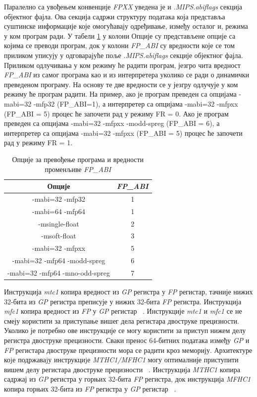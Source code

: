 \documentclass[12pt,oneside]{memoir}
\begin{document}
\indent Паралелно са увођењем конвенције \textit{FPXX} уведена је и  \textit{.MIPS.abiflags} секција објектног фајла. Ова секција садржи структуру података која представља суштинске информације које омогућавају одређивање, између осталог и, режима у ком програм ради. У табели \ref{tbl:fpabi} у колони Опције су представљене опције са којима се преводи програм, док у колони \textit{FP\_ABI} су вредности које се том приликом уписују у одговарајуће поље \textit{.MIPS.abiflags} секције објектног фајла. Приликом одлучивања у ком режиму ће радити програм, језгро чита вредност \textit{FP\_ABI} из самог програма као и из интерпретера уколико се ради о динамички преведеном програму. На основу те две вредности се у језгру одлучује у ком режиму ће програм радити. На пример, ако је програм преведен са опцијама -mabi=32 -mfp32 (FP\_ABI=1), а интерпретер са опцијама  -mabi=32 -mfpxx (FP\_ABI = 5) процес ће започети рад у режиму FR = 0. Ако је програм преведен са опцијама -mabi=32 -mfpxx -modd-spreg (FP\_ABI = 6), а интерпретер са опцијама  -mabi=32 -mfpxx (FP\_ABI = 5) процес ће започети рад у режиму FR = 1.


\begin{table}
\centering
\caption{Опције за превођење програма и вредности променљиве \textit{FP\_ABI}}
\label{tbl:fpabi}
\begin{tabular}{ |c|c| }
Опције & \textit{FP\_ABI} \\\midrule
-mabi=32 -mfp32 & 1 \\
-mabi=64 -mfp64 & 1 \\
-msingle-float  & 2 \\
-msoft-float    & 3 \\
-mabi=32 -mfpxx & 5 \\
-mabi=32 -mfp64 -modd-spreg & 6 \\
-mabi=32 -mfp64 -mno-odd-spreg & 7 \\
\end{tabular}
\end{table}

\indent Инструкција \textit{mtc1} копира вредност из \textit{GP} регистра у \textit{FP} регистар, тачније нижих 32-бита из \textit{GP} регистра  преписује у нижих 32-бита \textit{FP} регистра. Инструкција \textit{mfc1} копира вредност из \textit{FP} у \textit{GP} регистар ~\cite{MIPSInstrSet}. Инструкције \textit{mtc1} и \textit{mfc1} се не смеју користити за приступање вишег дела регистара двоструке прецизности. Уколико је потребно ове инструкције се могу користити за приступ нижем делу регистра двоструке прецизности. Сваки пренос 64-битних података између \textit{GP} и \textit{FP} регистара двоструке прецизности мора се радити кроз меморију. Архитектуре коjе подржаваjу инструкциjе \textit{MTHC1/MFHC1} могу оптималније приступити вишем делу регистара двоструке прецизности ~\cite{fpxxRef}. Инструкција \textit{MTHC1} копира садржај из \textit{GP} регистра у горњих 32-бита \textit{FP} регистра, док инструкција \textit{MFHC1} копира горњих 32-бита из \textit{FP} регистра у \textit{GP} регистар ~\cite{MIPSInstrSet}.
\end{document}
